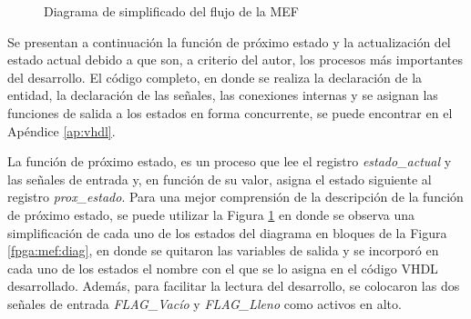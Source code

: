 \begin{figure}[!hb]
	\caption{Diagrama de simplificado del flujo de la MEF}
	\label{fpga:mef:simple}
\end{figure}

Se presentan a continuación la función de próximo estado y la actualización del estado actual debido a que son, a criterio del autor, los procesos más importantes del desarrollo. El código completo, en donde se realiza la declaración de la entidad, la declaración de las señales, las conexiones internas y se asignan las funciones de salida a los estados en forma concurrente, se puede encontrar en el Apéndice \ref{ap:vhdl}.

La función de próximo estado, es un proceso que lee el registro \textit{estado\_actual} y las señales de entrada y, en función de su valor, asigna el estado siguiente al registro \textit{prox\_estado}. Para una mejor comprensión de la descripción de la función de próximo estado, se puede utilizar la Figura \ref{fpga:mef:simple} en donde se observa una simplificación de cada uno de los estados del diagrama en bloques de la Figura \ref{fpga:mef:diag}, en donde se quitaron las variables de salida y se incorporó en cada uno de los estados el nombre con el que se lo asigna en el código VHDL desarrollado. Además, para facilitar la lectura del desarrollo, se colocaron las dos señales de entrada \textit{FLAG\_Vacío} y \textit{FLAG\_Lleno} como activos en alto.

